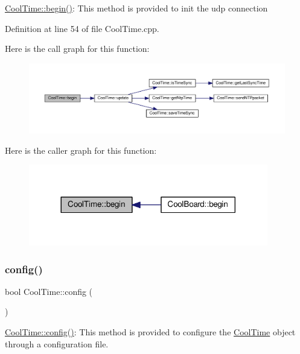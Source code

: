 \hyperlink{class_cool_time_ab1976cf718b950bc31e003c3323b8adb}{Cool\+Time\+::begin()}\+: This method is provided to init the udp connection 

Definition at line 54 of file Cool\+Time.\+cpp.

Here is the call graph for this function\+:\nopagebreak
\begin{figure}[H]
\begin{center}
\leavevmode
\includegraphics[width=350pt]{class_cool_time_ab1976cf718b950bc31e003c3323b8adb_cgraph}
\end{center}
\end{figure}
Here is the caller graph for this function\+:\nopagebreak
\begin{figure}[H]
\begin{center}
\leavevmode
\includegraphics[width=296pt]{class_cool_time_ab1976cf718b950bc31e003c3323b8adb_icgraph}
\end{center}
\end{figure}
\mbox{\label{class_cool_time_a87c28260c1bc77091162cbcf1ee2e129}} 
\subsubsection{\texorpdfstring{config()}{config()}\hspace{0.1cm}{\footnotesize\ttfamily [1/2]}}
{\footnotesize\ttfamily bool Cool\+Time\+::config (\begin{DoxyParamCaption}{ }\end{DoxyParamCaption})}

\hyperlink{class_cool_time_a87c28260c1bc77091162cbcf1ee2e129}{Cool\+Time\+::config()}\+: This method is provided to configure the \hyperlink{class_cool_time}{Cool\+Time} object through a configuration file.

